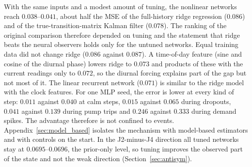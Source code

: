 \documentclass[conference]{IEEEtran}
\begin{document}
\begin{table}[t]
\centering
\caption{Equal-input comparison of ridge and tuned networks.}
\label{tab:tuned}
\small
{}
\end{table}

With the same inputs and a modest amount of tuning, the nonlinear networks reach $0.038$--$0.041$, about half the MSE of the full-history ridge regression ($0.086$) and of the true-transition-matrix Kalman filter ($0.078$). The ranking of the original comparison therefore depended on tuning and the statement that ridge beats the neural observers holds only for the untuned networks. Equal training data did not change ridge ($0.086$ against $0.087$). A time-of-day feature (sine and cosine of the diurnal phase) lowers ridge to $0.073$ and products of these with the current readings only to $0.072$, so the diurnal forcing explains part of the gap but not most of it. The linear recurrent network ($0.071$) is similar to the ridge model with the clock features. For one MLP seed, the error is lower at every kind of step: $0.011$ against $0.040$ at calm steps, $0.015$ against $0.065$ during dropouts, $0.041$ against $0.139$ during pump trips and $0.246$ against $0.333$ during demand spikes. The advantage therefore is not confined to events. Appendix~\ref{sec:model_based} isolates the mechanism with model-based estimators and with controls on the start. In the J2-minus-J4 direction all tuned networks stay at $0.0695$--$0.0696$, the prior-only level, so tuning improves the observed part of the state and not the weak direction (Section~\ref{sec:antisym}).
\end{document}

